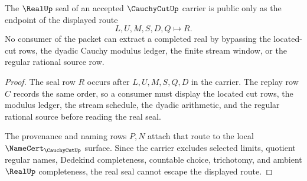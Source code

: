 \begin{theorem}
\label{thm:cauchy-cut-real-seal-nonescape}
The $\RealUp$ seal of an accepted $\CauchyCutUp$ carrier is public only as the endpoint of the displayed route
$$
L,U,M,S,D,Q \longmapsto R .
$$
No consumer of the packet can extract a completed real by bypassing the located-cut rows, the dyadic Cauchy modulus ledger, the finite stream window, or the regular rational source row.
\end{theorem}
\begin{proof}
The seal row $R$ occurs after $L,U,M,S,Q,D$ in the carrier. The replay row $C$ records the same order, so a consumer must display the located cut rows, the modulus ledger, the stream schedule, the dyadic arithmetic, and the regular rational source before reading the real seal.

The provenance and naming rows $P,N$ attach that route to the local $\NameCert_{\CauchyCutUp}$ surface. Since the carrier excludes selected limits, quotient regular names, Dedekind completeness, countable choice, trichotomy, and ambient $\RealUp$ completeness, the real seal cannot escape the displayed route.
\end{proof}




